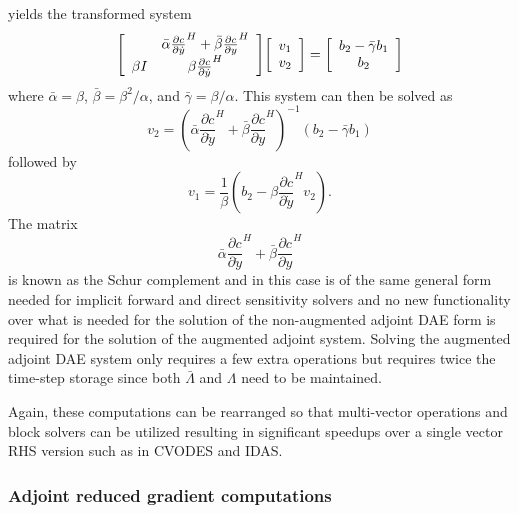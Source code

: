 \documentclass[pdf,ps2pdf,11pt]{SANDreport}
\begin{document}
%
yields the transformed system
%
\begin{equation}
{\bmat{cc}
 & \bar{\alpha} \frac{\partial c}{\partial \dot{y}}^H + \bar{\beta} \frac{\partial c}{\partial y}^H \\
\beta I &  \beta \frac{\partial c}{\partial \dot{y}}^H
\emat}
{\bmat{c} v_1 \\ v_2 \emat}
=
{\bmat{c}  b_2 - \bar{\gamma} b_1 \\ b_2 \emat}
\label{rythmos:eqn:aug-adj-sens-trans-system}
\end{equation}
%
where $\bar{\alpha}=\beta$, $\bar{\beta}=\beta^2/\alpha$, and
$\bar{\gamma}=\beta/\alpha$.  This system can then be solved as
%
\[
v_2 = \left( \bar{\alpha} \frac{\partial c}{\partial \dot{y}}^H + \bar{\beta} \frac{\partial c}{\partial y}^H \right)^{-1}
\left(  b_2 - \bar{\gamma} b_1 \right)
\]
%
followed by
%
\[
v_1 = \frac{1}{\beta} \left( b_2 - \beta \frac{\partial c}{\partial \dot{y}}^H v_2 \right).
\]
%
The matrix
%
\[
\bar{\alpha} \frac{\partial c}{\partial \dot{y}}^H + \bar{\beta} \frac{\partial c}{\partial y}^H
\]
%
is known as the Schur complement and in this case is of the same general form
needed for implicit forward and direct sensitivity solvers and no new
functionality over what is needed for the solution of the non-augmented
adjoint DAE form is required for the solution of the augmented adjoint system.
Solving the augmented adjoint DAE system only requires a few extra operations
but requires twice the time-step storage since both $\bar{\Lambda}$ and
$\Lambda$ need to be maintained.

Again, these computations can be rearranged so that multi-vector operations
and block solvers can be utilized resulting in significant speedups over a
single vector RHS version such as in CVODES and IDAS.

\subsubsection{Adjoint reduced gradient computations}
\end{document}

